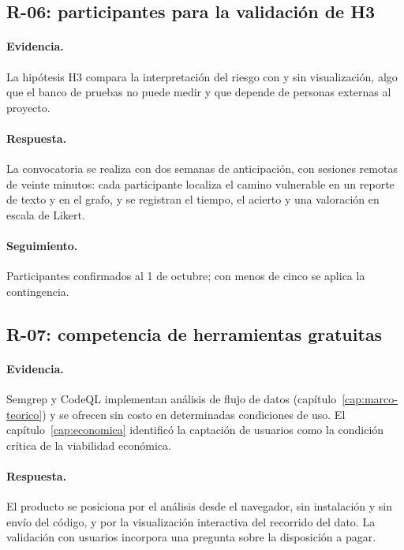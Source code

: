 \subsection{R-06: participantes para la validación de H3}\label{sec:n6.4.6}

\paragraph{Evidencia.} La hipótesis H3 compara la interpretación del riesgo con y sin visualización, algo que el banco de pruebas no puede medir y que depende de personas externas al proyecto.

\paragraph{Respuesta.} La convocatoria se realiza con dos semanas de anticipación, con sesiones remotas de veinte minutos: cada participante localiza el camino vulnerable en un reporte de texto y en el grafo, y se registran el tiempo, el acierto y una valoración en escala de Likert.

\paragraph{Seguimiento.} Participantes confirmados al 1 de octubre; con menos de cinco se aplica la contingencia.

\subsection{R-07: competencia de herramientas gratuitas}\label{sec:n6.4.7}

\paragraph{Evidencia.} Semgrep y CodeQL implementan análisis de flujo de datos (capítulo~\ref{cap:marco-teorico}) y se ofrecen sin costo en determinadas condiciones de uso. El capítulo~\ref{cap:economica} identificó la captación de usuarios como la condición crítica de la viabilidad económica.

\paragraph{Respuesta.} El producto se posiciona por el análisis desde el navegador, sin instalación y sin envío del código, y por la visualización interactiva del recorrido del dato. La validación con usuarios incorpora una pregunta sobre la disposición a pagar.

